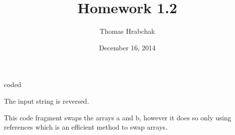 \documentclass[10pt,a4paper]{article}
\title{Homework 1.2}
\author{Thomas Hrabchak}
\date{December 16, 2014}
\newenvironment{problem}[2][Problem]{\begin{trivlist}
  \item[\hskip \labelsep {\bfseries #1}\hskip \labelsep {\bfseries #2}]}{\end{trivlist}}
\begin{document}
\maketitle

\begin{problem}{1.2.6} coded
\end{problem}

\begin{problem}{1.2.7} The input string is reversed.
\end{problem}

\begin{problem}{1.2.8} This code fragment swaps the arrays a and b, however it does so only using references which is an efficient method to swap arrays.
\end{problem}
\end{document}
